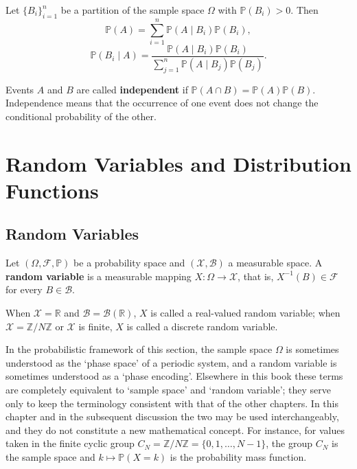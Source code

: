 \begin{definition}\label{def:total_probability_bayes}
Let $\{B_i\}_{i=1}^n$ be a partition of the sample space $\Omega$ with $\mathbb{P}(B_i) > 0$. Then
\[
\mathbb{P}(A) = \sum_{i=1}^n \mathbb{P}(A \mid B_i) \mathbb{P}(B_i),
\]
\[
\mathbb{P}(B_i \mid A) = \frac{\mathbb{P}(A \mid B_i) \mathbb{P}(B_i)}{\sum_{j=1}^n \mathbb{P}(A \mid B_j) \mathbb{P}(B_j)}.
\]
\end{definition}

\begin{definition}\label{def:independence}
Events $A$ and $B$ are called \textbf{independent} if $\mathbb{P}(A \cap B) = \mathbb{P}(A)\mathbb{P}(B)$. Independence means that the occurrence of one event does not change the conditional probability of the other.
\end{definition}

\section{Random Variables and Distribution Functions}\label{sec:random_variables}

\subsection{Random Variables}

\begin{definition}\label{def:random_variable}
Let $(\Omega, \mathcal{F}, \mathbb{P})$ be a probability space and $(\mathcal{X}, \mathcal{B})$ a measurable space. A \textbf{random variable} is a measurable mapping $X: \Omega \to \mathcal{X}$, that is, $X^{-1}(B) \in \mathcal{F}$ for every $B \in \mathcal{B}$.

When $\mathcal{X} = \mathbb{R}$ and $\mathcal{B} = \mathcal{B}(\mathbb{R})$, $X$ is called a real-valued random variable; when $\mathcal{X} = \mathbb{Z}/N\mathbb{Z}$ or $\mathcal{X}$ is finite, $X$ is called a discrete random variable.
\end{definition}

\begin{remark}\label{rem:phase_terminology_usage}
In the probabilistic framework of this section, the sample space $\Omega$ is sometimes understood as the `phase space' of a periodic system, and a random variable is sometimes understood as a `phase encoding'. Elsewhere in this book these terms are completely equivalent to `sample space' and `random variable'; they serve only to keep the terminology consistent with that of the other chapters. In this chapter and in the subsequent discussion the two may be used interchangeably, and they do not constitute a new mathematical concept. For instance, for values taken in the finite cyclic group $C_N = \mathbb{Z}/N\mathbb{Z} = \{0, 1, \dots, N-1\}$, the group $C_N$ is the sample space and $k \mapsto \mathbb{P}(X = k)$ is the probability mass function.
\end{remark}

